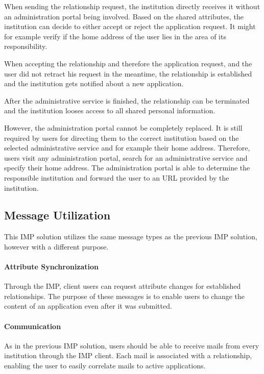When sending the relationship request, the institution directly receives it without an administration portal being involved. Based on the shared attributes, the institution can decide to either accept or reject the application request. It might for example verify if the home address of the user lies in the area of its responsibility.

When accepting the relationship and therefore the application request, and the user did not retract his request in the meantime, the relationship is established and the institution gets notified about a new application.

After the administrative service is finished, the relationship can be terminated and the institution looses access to all shared personal information.

However, the administration portal cannot be completely replaced. It is still required by users for directing them to the correct institution based on the selected administrative service and for example their home address. Therefore, users visit any administration portal, search for an administrative service and specify their home address. The administration portal is able to determine the responsible institution and forward the user to an URL provided by the institution. 

\subsection{Message Utilization}

This IMP solution utilizes the same message types as the previous IMP solution, however with a different purpose.

\paragraph{Attribute Synchronization}

Through the IMP, client users can request attribute changes for established relationships. The purpose of these messages is to enable users to change the content of an application even after it was submitted.

\paragraph{Communication}

As in the previous IMP solution, users should be able to receive mails from every institution through the IMP client. Each mail is associated with a relationship, enabling the user to easily correlate mails to active applications.

